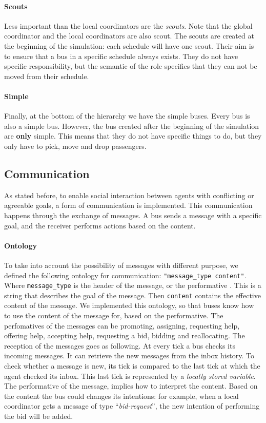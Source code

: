 \documentclass[a4paper]{article}
\begin{document}
\paragraph{Scouts}
Less important than the local coordinators are the \textit{scouts}. Note that the global coordinator and the local coordinators are also scout. The scouts are created at the beginning of the simulation: each schedule will have one scout. Their aim is to ensure that a bus in a specific schedule always exists. They do not have specific responsibility, but the semantic of the role specifies that they can not be moved from their schedule. 

\paragraph{Simple}
Finally, at the bottom of the hierarchy we have the simple buses. Every bus is also a simple bus. However, the bus created after the beginning of the simulation are \textbf{only} simple. This means that they do not have specific things to do, but they only have to pick, move and drop passengers. 

\subsection{Communication}
As stated before, to enable social interaction between agents with conflicting or agreeable goals, a form of communication is implemented. This communication happens through the exchange of messages. A bus sends a message with a specific goal, and the receiver performs actions based on the content.
\paragraph{Ontology}
To take into account the possibility of messages with different purpose, we defined the following ontology for communication: \texttt{"message\_type content"}. Where  \texttt{message\_type} is the header of the message, or the performative \cite{fipa}. This is a string that describes the goal of the message. Then \texttt{content} contains the effective content of the message. We implemented this ontology, so that buses know how to use the content of the message for, based on the performative. The perfomatives of the messages can be promoting, assigning, requesting help, offering help, accepting help, requesting a bid, bidding and reallocating. 
\newline
The reception of the messages goes as following. At every tick a bus checks its incoming messages. It can retrieve the new messages from the inbox history. To check whether a message is new, its tick is compared to the last tick at which the agent checked its inbox. This last tick is represented by a \textit{locally stored variable}. The performative of the message, implies how to interpret the content. Based on the content the bus could changes its intentions: for example, when a local coordinator gets a message of type ``\textit{bid-request}'', the new intention of performing the bid will be added.
\end{document}
